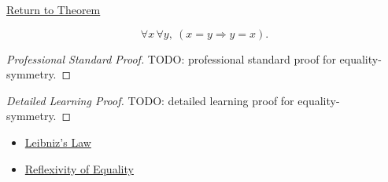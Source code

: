 \newpage
{}
\label{prf:equality-symmetry}

\begin{remark*}[Return]
\hyperref[thm:equality-symmetry]{Return to Theorem}
\end{remark*}

\begin{theorem*}
\[
\forall x\,\forall y,\ (x=y \Longrightarrow y=x).
\]
\end{theorem*}

\begin{proof}[Professional Standard Proof]
\LRAProofBodyStart
TODO: professional standard proof for equality-symmetry.
\end{proof}

\begin{proof}[Detailed Learning Proof]
\LRAProofBodyStart
TODO: detailed learning proof for equality-symmetry.
\end{proof}

\begin{remark*}
\end{remark*}

\begin{dependencies}
\begin{itemize}
  \item \hyperref[ax:leibniz-law]{Leibniz's Law}
  \item \hyperref[ax:equality-reflexivity]{Reflexivity of Equality}
\end{itemize}
\end{dependencies}

\clearpage
